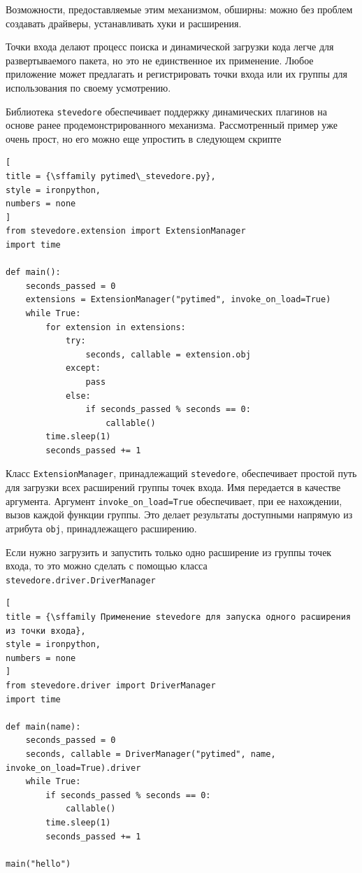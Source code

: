 \documentclass[%
	11pt,
	a4paper,
	utf8,
		]{article}
\begin{document}
Возможности, предоставляемые этим механизмом, обширны: можно без проблем создавать драйверы, устанавливать хуки и расширения.

Точки входа делают процесс поиска и динамической загрузки кода легче для развертываемого пакета, но это не единственное их применение. Любое приложение может предлагать и регистрировать точки входа или их группы для использования по своему усмотрению.

Библиотека \texttt{stevedore} обеспечивает поддержку динамических плагинов на основе ранее продемонстрированного механизма. Рассмотренный пример уже очень прост, но его можно еще упростить в следующем скрипте
\begin{lstlisting}[
title = {\sffamily pytimed\_stevedore.py},
style = ironpython,
numbers = none
]
from stevedore.extension import ExtensionManager
import time

def main():
    seconds_passed = 0
    extensions = ExtensionManager("pytimed", invoke_on_load=True)
    while True:
        for extension in extensions:
            try:
                seconds, callable = extension.obj
            except:
                pass
            else:
                if seconds_passed % seconds == 0:
                    callable()
        time.sleep(1)
        seconds_passed += 1
\end{lstlisting}

Класс \texttt{ExtensionManager}, принадлежащий \texttt{stevedore}, обеспечивает простой путь для загрузки всех расширений группы точек входа. Имя передается в качестве аргумента. Аргумент \texttt{invoke\_on\_load=True} обеспечивает, при ее нахождении, вызов каждой функции группы. Это делает результаты доступными напрямую из атрибута \texttt{obj}, принадлежащего расширению.

Если нужно загрузить и запустить только одно расширение из группы точек входа, то это можно сделать с помощью класса \texttt{stevedore.driver.DriverManager}
\begin{lstlisting}[
title = {\sffamily Применение stevedore для запуска одного расширения из точки входа},
style = ironpython,
numbers = none	
]
from stevedore.driver import DriverManager
import time

def main(name):
    seconds_passed = 0
    seconds, callable = DriverManager("pytimed", name, invoke_on_load=True).driver
    while True:
        if seconds_passed % seconds == 0:
            callable()
        time.sleep(1)
        seconds_passed += 1
        
main("hello")
\end{lstlisting}
\end{document}
